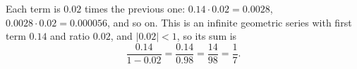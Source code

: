 Each term is $0.02$ times the previous one: $0.14\cdot0.02=0.0028$, $0.0028\cdot0.02=0.000056$, and so on. This is an infinite geometric series with first term $0.14$ and ratio $0.02$, and $|0.02|<1$, so its sum is
\[
\dfrac{0.14}{1-0.02}=\dfrac{0.14}{0.98}=\dfrac{14}{98}=\boxed{\dfrac{1}{7}}.
\]
